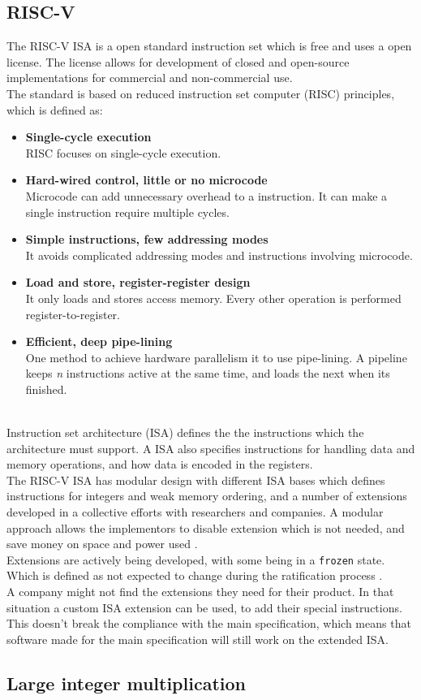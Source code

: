 \subsection{RISC-V}
The RISC-V ISA is a open standard instruction set which is free and uses a open license. The license allows for development of closed and open-source implementations for commercial and non-commercial use.\\
The standard is based on reduced instruction set computer (RISC) principles, which is defined as:
\begin{itemize}
    \item \textbf{Single-cycle execution}\\RISC focuses on single-cycle execution.
    \item \textbf{Hard-wired control, little or no microcode}\\Microcode can add unnecessary overhead to a instruction. It can make a single instruction require multiple cycles.
    \item \textbf{Simple instructions, few addressing modes}\\It avoids complicated addressing modes and instructions involving microcode. 
    \item \textbf{Load and store, register-register design}\\It only loads and stores access memory. Every other operation is performed register-to-register.
    \item \textbf{Efficient, deep pipe-lining}\\One method to achieve hardware parallelism it to use pipe-lining. A pipeline keeps \textit{n} instructions active at the same time, and loads the next when its finished.
\end{itemize}
\\
Instruction set architecture (ISA) defines the the instructions which the architecture must support. A ISA also specifies instructions for handling data and memory operations, and how data is encoded in the registers.
\\
The RISC-V ISA has modular design with different ISA bases which defines instructions for integers and weak memory ordering, and a number of extensions developed in a collective efforts with researchers and companies.
A modular approach allows the implementors to disable extension which is not needed, and save money on space and power used \cite{extendrisc}. \\
Extensions are actively being developed, with some being in a \texttt{frozen} state. Which is defined as not expected to change during the ratification process \cite{riscmanual}.
\\
A company might not find the extensions they need for their product. In that situation a custom ISA extension can be used, to add their special instructions. 
This doesn't break the compliance with the main specification, which means that software made for the main specification will still work on the extended ISA.


\subsection{Large integer multiplication} 



